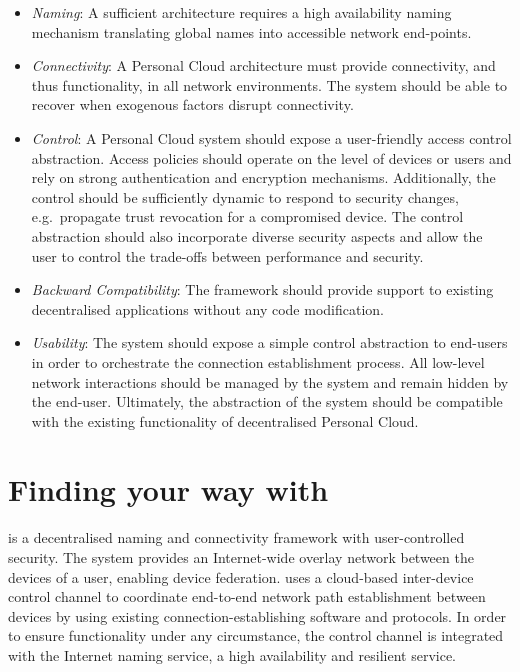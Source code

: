 \begin{itemize}
    \item {\it Naming}\/: A sufficient architecture requires a high
    availability naming mechanism translating global names into accessible
    network end-points.

  \item {\it Connectivity}\/: A Personal Cloud architecture must provide
    connectivity, and thus functionality, in all network environments.  The
    system should be able to recover when exogenous factors disrupt
    connectivity.

  \item {\it Control}\/: A Personal Cloud system should expose a user-friendly
    access control abstraction.  Access policies should operate on the level
    of devices or users and rely on strong authentication and encryption
    mechanisms. Additionally, the control should be sufficiently dynamic to
    respond to security changes, e.g.~propagate trust revocation for a
    compromised device. The control abstraction should also
    incorporate diverse security aspects and allow the user to control the
    trade-offs between performance and security.

  \item {\it Backward Compatibility}\/: The framework should provide support to
    existing decentralised applications without any code modification.

  \item {\it Usability}\/: The system should expose a simple control abstraction
    to end-users in order to orchestrate the connection establishment
    process. All low-level network interactions should be managed by the
    system and remain hidden by the end-user. Ultimately, the
    abstraction of the system should be compatible with the existing
    functionality of decentralised Personal Cloud. 

 \end{itemize}


\section{Finding your way with \signpost}\label{sec:sp-signpost}

\signpost is a decentralised naming and connectivity framework with
user-controlled security.  The system provides an Internet-wide overlay network
between the devices of a user, enabling device federation.
\signpost uses a cloud-based inter-device control channel to
coordinate end-to-end network path establishment between devices by using existing
connection-establishing software and protocols.  In order to ensure functionality
under any circumstance, the \signpost control channel is integrated with the
Internet naming service, a high availability and resilient service. 

